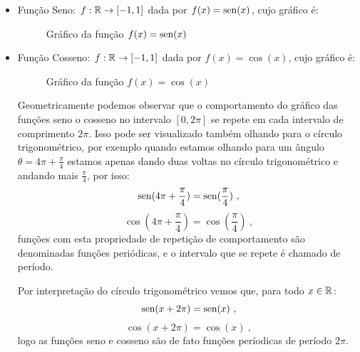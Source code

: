   \begin{itemize}
  \item Função Seno: $f: \mathbb{R} \rightarrow [-1, 1]$ dada por $f(x)= \operatorname{sen} (x)$, cujo gráfico é:

  \begin{figure}[H]
  \centering
    \caption{Gráfico da função $f(x)= \operatorname{sen}(x)$}
  \end{figure}

  \item Função Cosseno: $f: \mathbb{R} \rightarrow [-1, 1]$ dada por $f(x)= \cos(x)$, cujo gráfico é:

  \begin{figure}[H]
  \centering
    \caption{Gráfico da função $f(x)= \cos(x)$}
  \end{figure}

  Geometricamente podemos observar que o comportamento do gráfico das funções seno o cosseno no intervalo $[0, 2\pi]$ se repete em cada intervalo de comprimento $2\pi$. Isso pode ser visualizado também olhando para o círculo trigonométrico, por exemplo quando estamos olhando para um ângulo $\theta= 4\pi + \frac{\pi}{4}$ estamos apenas dando duas voltas no círculo trigonométrico e andando mais $\frac{\pi}{4}$, por isso:
\begin{equation}
\operatorname{sen}(4\pi + \frac{\pi}{4})= \operatorname{sen}(\frac{\pi}{4}) \ ,
\end{equation}
\begin{equation}
\cos(4\pi + \frac{\pi}{4})= \cos(\frac{\pi}{4}) \ , 
\end{equation}
  funções com esta propriedade de repetição de comportamento são denominadas funções periódicas, e o intervalo que se repete é chamado de período.

  Por interpretação do círculo trigonométrico vemos que, para todo $x \in \mathbb{R}$:
\begin{equation}
\operatorname{sen}(x + 2 \pi)= \operatorname{sen}(x) \ ,
\end{equation}
\begin{equation}
\cos(x + 2\pi)= \cos(x) \ , 
\end{equation}
  logo as funções seno e cosseno são de fato funções períodicas de período $2\pi$.


\end{itemize}
